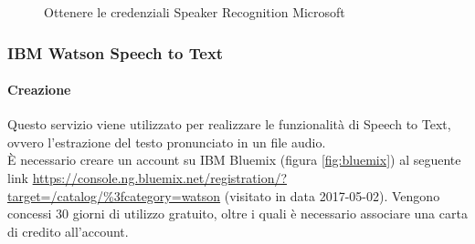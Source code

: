 \begin{figure}[h]
	\caption{Ottenere le credenziali Speaker Recognition Microsoft}\label{fig:credMicrosoft}
\end{figure}
\newpage
\subsubsection{IBM Watson Speech to Text}
\paragraph{Creazione}
Questo servizio viene utilizzato per realizzare le funzionalità di Speech to Text, ovvero l'estrazione del testo pronunciato in un file audio.\\
È necessario creare un account su IBM Bluemix (figura \ref{fig:bluemix}) al seguente link \url{https://console.ng.bluemix.net/registration/?target=/catalog/\%3fcategory=watson} (visitato in data 2017-05-02). Vengono concessi 30 giorni di utilizzo gratuito, oltre i quali è necessario associare una carta di credito all'account.

